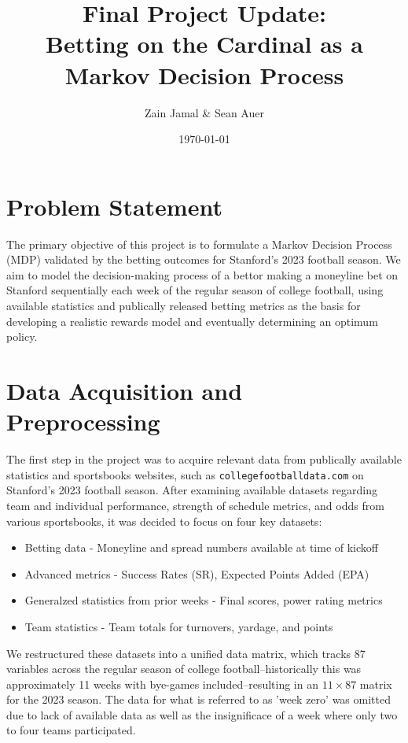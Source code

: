 \documentclass{article}
\title{Final Project Update: \\ Betting on the Cardinal as a Markov Decision Process}
\author{Zain Jamal & Sean Auer}
\date{\today}
\begin{document}
\maketitle

\section*{Problem Statement}

The primary objective of this project is to formulate a Markov Decision Process (MDP) validated by the betting outcomes for Stanford's 2023 football season. 
We aim to model the decision-making process of a bettor making a moneyline bet on Stanford sequentially each week of the regular season of college football,
using available statistics and publically released betting metrics as the basis for developing a realistic rewards model and eventually determining an optimum policy.

\section*{Data Acquisition and Preprocessing}

The first step in the project was to acquire relevant data from publically available statistics and sportsbooks websites, such as \texttt{collegefootballdata.com} on Stanford’s 2023 football season. 
After examining available datasets regarding team and individual performance, strength of schedule metrics, and odds from various sportsbooks, it was decided to focus on four key datasets: 
\begin{itemize}
    \item Betting data - Moneyline and spread numbers available at time of kickoff
    \item Advanced metrics - Success Rates (SR), Expected Points Added (EPA)
    \item Generalzed statistics from prior weeks - Final scores, power rating metrics
    \item Team statistics - Team totals for turnovers, yardage, and points
\end{itemize}
We restructured these datasets into a unified data matrix, which tracks 87 variables across the regular season of college football--historically this was approximately 
11 weeks with bye-games included--resulting in an $11 \times 87$ matrix for the 2023 season. The data for what is referred to as 'week zero' was omitted due to lack of
available data as well as the insignificace of a week where only two to four teams participated.
\end{document}
